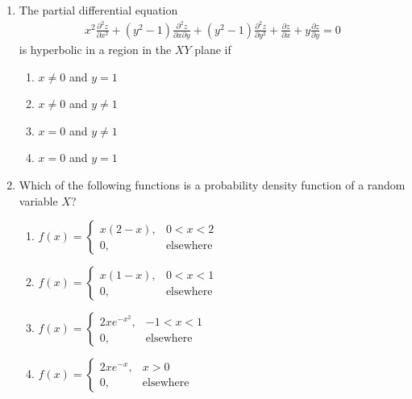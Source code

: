 \documentclass[journal]{IEEEtran}
\numberwithin{equation}{enumi}
\numberwithin{figure}{enumi}
\begin{document}
\begin{enumerate}
\item The partial differential equation
\begin{align*}
x^2 \frac{\partial^2 z}{\partial x^2} + (y^2 - 1) \frac{\partial^2 z}{\partial x \partial y} + (y^2 - 1) \frac{\partial^2 z}{\partial y^2} + \frac{\partial z}{\partial x} + y \frac{\partial z}{\partial y} = 0
\end{align*}
is hyperbolic in a region in the $XY$ plane if
\hfill{}
\begin{multicols}{4}
\begin{enumerate}
    \item $x \neq 0$ and $y = 1$ 
    \item $x \neq 0$ and $y \neq 1$
    \item $x = 0$ and $y \neq 1$
    \item $x = 0$ and $y = 1$
\end{enumerate}
\end{multicols}



\item Which of the following functions is a probability density function of a random variable $X$?
\hfill{}
\begin{multicols}{2}
\begin{enumerate}
    \item $f(x) = \begin{cases} x(2-x), & 0 < x < 2 \\ 0, & \text{elsewhere} \end{cases}$
    \item $f(x) = \begin{cases} x(1-x), & 0 < x < 1 \\ 0, & \text{elsewhere} \end{cases}$
    \item $f(x) = \begin{cases} 2x e^{-x^2}, & -1 < x < 1 \\ 0, & \text{elsewhere} \end{cases}$
    \item $f(x) = \begin{cases} 2x e^{-x}, & x > 0 \\ 0, & \text{elsewhere} \end{cases}$
\end{enumerate}
\end{multicols}



\end{enumerate}
\end{document}
